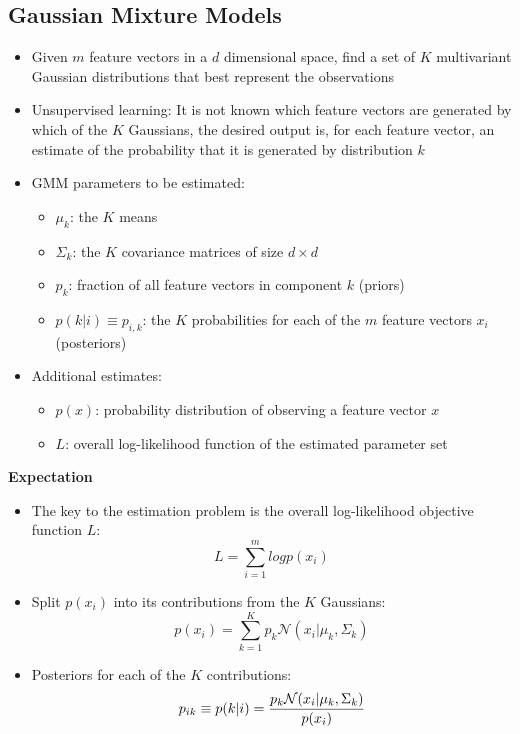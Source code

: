 \subsection*{Gaussian Mixture Models}
\begin{itemize}
    \item
        Given $m$ feature vectors in a $d$ dimensional space, find a set of $K$ multivariant Gaussian distributions that best represent the observations
    \item
        Unsupervised learning: It is not known which feature vectors are generated by which of the $K$ Gaussians, the desired output is, for each feature vector, an estimate of the probability that it is generated by distribution $k$
    \item
        GMM parameters to be estimated:
        \begin{itemize}
            \item
                $\mu_k$: the $K$ means
            \item
                $\Sigma_k$: the $K$ covariance matrices of size $d \times d$
            \item
                $p_k$: fraction of all feature vectors in component $k$ (priors)
            \item
                $p(k|i) \equiv p_{i,k}$: the $K$ probabilities for each of the $m$ feature vectors $x_i$ (posteriors)
        \end{itemize}
    \item
        Additional estimates:
        \begin{itemize}
            \item
                $p(x)$: probability distribution of observing a feature vector $x$
            \item
                $L$: overall log-likelihood function of the estimated parameter set
        \end{itemize}
\end{itemize}
\textbf{Expectation}
\begin{itemize}
    \item
        The key to the estimation problem is the overall log-likelihood objective function $L$:
        $$L = \sum_{i=1}^m log p(x_i)$$
    \item
        Split $p(x_i)$ into its contributions from the $K$ Gaussians:
        $$p(x_i) = \sum_{k=1}^K p_k \mathcal{N}(x_i|\mu_k,\Sigma_k)$$
    \item
        Posteriors for each of the $K$ contributions:
        $$p_{ik} \equiv p(k|i) = \frac{\displaystyle p_k \mathcal{N}(x_i|\mu_k,\Sigma_k)}{\displaystyle p(x_i)}$$
\end{itemize}
